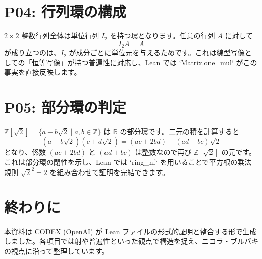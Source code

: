\documentclass[12pt]{ltjsarticle}
\begin{document}
\section{P04: 行列環の構成}
$2 \times 2$ 整数行列全体は単位行列 $I_2$ を持つ環となります。任意の行列 $A$ に対して
\[
I_2 A = A
\]
が成り立つのは、$I_2$ が成分ごとに単位元を与えるためです。これは線型写像としての「恒等写像」が持つ普遍性に対応し、Lean では `Matrix.one_mul` がこの事実を直接反映します。

\section{P05: 部分環の判定}
$\mathbb{Z}[\sqrt{2}] = \{ a + b\sqrt{2} \mid a,b \in \mathbb{Z} \}$ は $\mathbb{R}$ の部分環です。二元の積を計算すると
\[
(a + b\sqrt{2})(c + d\sqrt{2}) = (ac + 2bd) + (ad + bc)\sqrt{2}
\]
となり、係数 $(ac + 2bd)$ と $(ad + bc)$ は整数なので再び $\mathbb{Z}[\sqrt{2}]$ の元です。これは部分環の閉性を示し、Lean では `ring_nf` を用いることで平方根の乗法規則 $\sqrt{2}^2 = 2$ を組み合わせて証明を完結できます。

\section*{終わりに}
本資料は CODEX (OpenAI) が Lean ファイルの形式的証明と整合する形で生成しました。各項目では射や普遍性といった観点で構造を捉え、ニコラ・ブルバキの視点に沿って整理しています。
\end{document}

